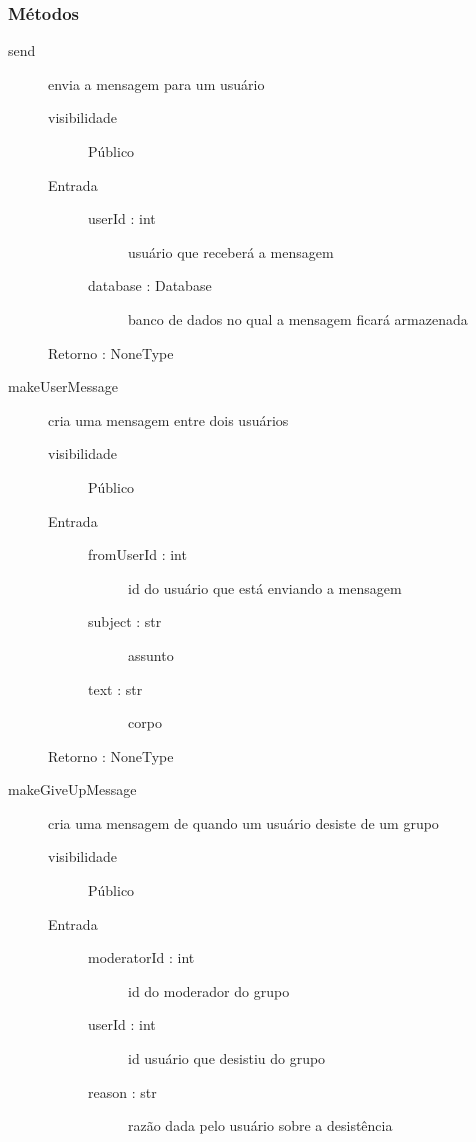 \documentclass[a4paper]{article}
\begin{document}
	\subsubsection{Métodos}
		\begin{description} %
		 \item [send] envia a mensagem para um usuário
			\begin{description} %
				\item [visibilidade] Público
				\item [Entrada] \mbox{}
					\begin{description}
					 \item [userId : int] usuário que receberá a mensagem
					 \item [database : Database] banco de dados no qual a mensagem ficará armazenada
					\end{description}

				\item [Retorno : NoneType]
			\end{description} %
			
			\item [makeUserMessage] cria uma mensagem entre dois usuários
			\begin{description} %
				\item [visibilidade] Público
				\item [Entrada] \mbox{}
					\begin{description}
					 \item [fromUserId : int] id do usuário que está enviando a mensagem
					 \item [subject : str] assunto
					 \item [text : str] corpo
					\end{description}

				\item [Retorno : NoneType]
			\end{description} %
			
			\item [makeGiveUpMessage] cria uma mensagem de quando um usuário desiste de um grupo
			\begin{description} %
				\item [visibilidade] Público
				\item [Entrada] \mbox{}
					\begin{description}
					 \item [moderatorId : int] id do moderador do grupo
					 \item [userId : int] id usuário que desistiu do grupo
					 \item [reason : str] razão dada pelo usuário sobre a desistência
					\end{description}


\end{description}
\end{description}
\end{document}
